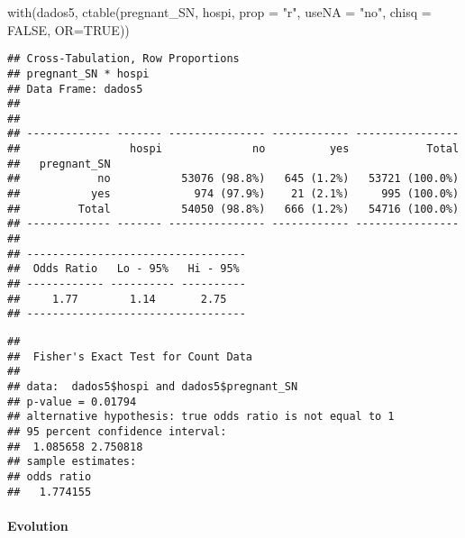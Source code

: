 \documentclass[
]{article}
\newenvironment{Shaded}{\begin{snugshade}}{\end{snugshade}}
\newcommand{\AttributeTok}[1]{\textcolor[rgb]{0.77,0.63,0.00}{#1}}
\newcommand{\ConstantTok}[1]{\textcolor[rgb]{0.00,0.00,0.00}{#1}}
\newcommand{\FunctionTok}[1]{\textcolor[rgb]{0.00,0.00,0.00}{#1}}
\newcommand{\NormalTok}[1]{#1}
\newcommand{\SpecialCharTok}[1]{\textcolor[rgb]{0.00,0.00,0.00}{#1}}
\newcommand{\StringTok}[1]{\textcolor[rgb]{0.31,0.60,0.02}{#1}}
\begin{document}
\begin{Shaded}
\begin{Highlighting}[]
\FunctionTok{with}\NormalTok{(dados5, }\FunctionTok{ctable}\NormalTok{(pregnant\_SN, hospi, }\AttributeTok{prop =} \StringTok{"r"}\NormalTok{, }\AttributeTok{useNA =} \StringTok{"no"}\NormalTok{, }\AttributeTok{chisq =} \ConstantTok{FALSE}\NormalTok{, }\AttributeTok{OR=}\ConstantTok{TRUE}\NormalTok{))}
\end{Highlighting}
\end{Shaded}

\begin{verbatim}
## Cross-Tabulation, Row Proportions  
## pregnant_SN * hospi  
## Data Frame: dados5  
## 
## 
## ------------- ------- --------------- ------------ ----------------
##                 hospi              no          yes            Total
##   pregnant_SN                                                      
##            no           53076 (98.8%)   645 (1.2%)   53721 (100.0%)
##           yes             974 (97.9%)    21 (2.1%)     995 (100.0%)
##         Total           54050 (98.8%)   666 (1.2%)   54716 (100.0%)
## ------------- ------- --------------- ------------ ----------------
## 
## ----------------------------------
##  Odds Ratio   Lo - 95%   Hi - 95% 
## ------------ ---------- ----------
##     1.77        1.14       2.75   
## ----------------------------------
\end{verbatim}

\begin{Shaded}
\end{Shaded}

\begin{verbatim}
## 
##  Fisher's Exact Test for Count Data
## 
## data:  dados5$hospi and dados5$pregnant_SN
## p-value = 0.01794
## alternative hypothesis: true odds ratio is not equal to 1
## 95 percent confidence interval:
##  1.085658 2.750818
## sample estimates:
## odds ratio 
##   1.774155
\end{verbatim}

\hypertarget{evolution}{%
\paragraph{\texorpdfstring{{ Evolution
}}{ Evolution }}\label{evolution}}
\end{document}
